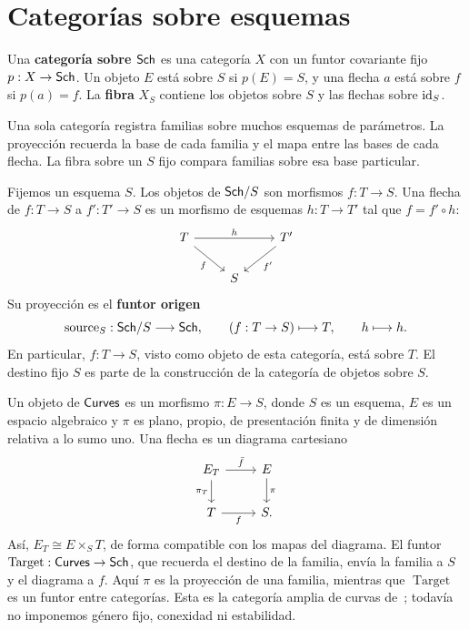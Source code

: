 \documentclass[12pt,openany]{memoir}
\begin{document}
\section{Categorías sobre esquemas}
\label{sec:over}

\begin{Def}
Una \textbf{categoría sobre \(\mathsf{Sch}\)} es una categoría \(X\) con un funtor
covariante fijo \(p:X\to\mathsf{Sch}\). Un objeto \(E\) está sobre \(S\) si
\(p(E)=S\), y una flecha \(a\) está sobre \(f\) si \(p(a)=f\).
La \textbf{fibra} \(X_S\) contiene los objetos sobre \(S\) y las flechas
sobre \(\operatorname{id}_S\).
\end{Def}

Una sola categoría registra familias sobre muchos esquemas de parámetros.
La proyección recuerda la base de cada familia y el mapa entre las bases
de cada flecha. La fibra sobre un \(S\) fijo compara familias sobre esa
base particular.

\begin{Ex}
Fijemos un esquema \(S\). Los objetos de \(\mathsf{Sch}/S\) son morfismos
\(f:T\to S\). Una flecha de \(f:T\to S\) a \(f':T'\to S\) es un
morfismo de esquemas \(h:T\to T'\) tal que \(f=f'\circ h\):
\[
\begin{tikzcd}
 T \arrow[rr,"h"] \arrow[dr,"f"'] && T' \arrow[dl,"f'"] \\
 & S
\end{tikzcd}
\]
Su proyección es el \textbf{funtor origen}
\[
 \operatorname{source}_S:\mathsf{Sch}/S\longrightarrow\mathsf{Sch},
 \qquad (f:T\to S)\longmapsto T,\qquad h\longmapsto h.
\]
En particular, \(f:T\to S\), visto como objeto de esta categoría, está
sobre \(T\). El destino fijo \(S\) es parte de la construcción de la
categoría de objetos sobre \(S\).
\end{Ex}

\begin{Ex}
Un objeto de \(\mathsf{Curves}\) es un morfismo \(\pi:E\to S\), donde \(S\)
es un esquema, \(E\) es un espacio algebraico y \(\pi\) es plano,
propio, de presentación finita y de dimensión relativa a lo sumo uno.
Una flecha es un diagrama cartesiano
\[
\begin{tikzcd}
 E_T \arrow[r,"\bar f"] \arrow[d,"\pi_T"'] & E \arrow[d,"\pi"] \\
 T \arrow[r,"f"'] & S .
\end{tikzcd}
\]
Así, \(E_T\cong E\times_S T\), de forma compatible con los mapas del
diagrama. El funtor \(\operatorname{Target}:\mathsf{Curves}\to\mathsf{Sch}\), que
recuerda el destino de la familia, envía la familia a \(S\) y el diagrama
a \(f\). Aquí \(\pi\) es la proyección de una familia, mientras que
\(\operatorname{Target}\) es un funtor entre categorías.
Esta es la categoría amplia de curvas de~\cite{sp:curves}; todavía no
imponemos género fijo, conexidad ni estabilidad.
\end{Ex}
\end{document}

